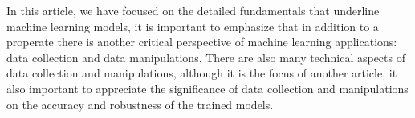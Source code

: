 
\par
In this article, we have focused on the detailed fundamentals that underline machine learning models, it is important to emphasize that in addition to a properate there is another critical perspective of machine learning applications: data collection and data manipulations. There are also many technical aspects of data collection and manipulations, although it is the focus of another article, it also important to appreciate the significance of data collection and manipulations on the accuracy and robustness of the trained models.
\par 
